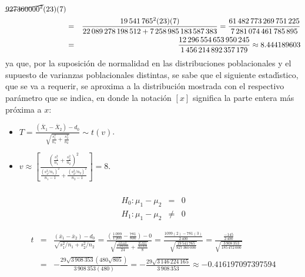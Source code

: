 \begin{solucion}
\begin{datos}
\begin{eqnarray*}
{{{   }{
   \cancel{927360000^2}(23)(7)
   }
   }}
   \\
   & = & 
   \frac{
   19\,541\,765^2(23)(7)
   }{
   22\,089\,278\,198\,512 + 7\,258\,985\,183\,587\,383
   }
   = \frac{61\,482\,773\,269\,751\,225}{7\,281\,074\,461\,785\,895} \\
   & = &
   \frac{12\,296\,554\,653\,950\,245}{1\,456\,214\,892\,357\,179}
   \approx 8.444189603
  \end{eqnarray*}
  ya que, por la suposici\'on de normalidad en las distribuciones
  poblacionales
  y el supuesto de varianzas poblacionales distintas,
  se sabe que el siguiente estad\'{\i}stico, que se va a requerir,
  se aproxima a la distribuci\'on mostrada
  con el respectivo par\'ametro que se indica,
  en donde la notaci\'on $[x]$ significa la parte entera
  m\'as pr\'oxima a $x$:
  \begin{itemize}
   \item $T = \displaystyle{ \frac{
   \left( \overline{X}_1 - \overline{X}_2 \right) - d_0
   }{
   \sqrt{\frac{s_1^2}{n_1} + \frac{s_2^2}{n_2}}
   } }
   \sim t(v)$.
   \item $v \approx \left[
   \frac{
   \displaystyle{\left(\frac{s_1^2}{n_1}+\frac{s_2^2}{n_2}\right)^2}
   }{\displaystyle{
   \frac{\left( s_1^2/n_1 \right)^2}{n_1 - 1} + 
   \frac{\left( s_2^2/n_2 \right)^2}{n_2 - 1}
   }}
   \right]
   = 8$.
  \end{itemize}
 \end{datos}

 \begin{hipotesis}
  $\phantom{0}$
  \begin{eqnarray*}
   H_0: \mu_1 - \mu_2 &   =  & 0 \\
   H_1: \mu_1 - \mu_2 & \neq & 0
  \end{eqnarray*}
 \end{hipotesis}

 \begin{estadistico}
  \begin{eqnarray*}
   t & = & \frac{
   \left( \bar{x}_1 - \bar{x}_2 \right) - d_0
   }{
   \sqrt{s_1^2/n_1 + s_2^2/n_2}
   }
   = \frac{\displaystyle{
   \left( \frac{1\,099}{1\,200} - \frac{781}{800} \right) - 0
   }}{\displaystyle{
   \sqrt{
   \frac{\frac{63\,443}{1\,380\,000}}{24} +
   \frac{\frac{85\,823}{560\,000}}{8}
   }
   }}
   = \frac{\displaystyle{
   \frac{1099(2) - 781(3)}{2\,400}
   }}{\displaystyle{
   \sqrt{\frac{19\,541\,765}{927\,360\,000}}
   }}
   = \frac{\displaystyle{
   \frac{-145}{2\,400}
   }}{\displaystyle{
   \sqrt{\frac{3\,908\,353}{185\,472\,000}}
   }} \\
   & = & -\frac{
   29\sqrt{3\,908\,353}\left( 480\sqrt{805} \right)
   }{
   3\,908\,353(480)
   }
   = -\frac{29\sqrt{3\,146\,224\,165}}{3\,908\,353}
   \approx -0.416197097397594
  \end{eqnarray*}
 \end{estadistico}


\end{solucion}
